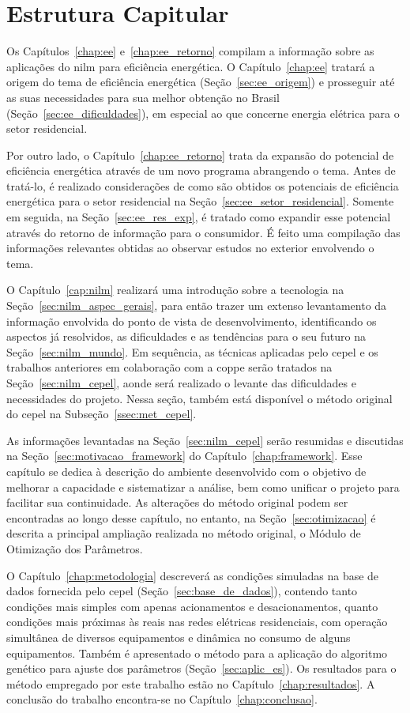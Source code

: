 \section{Estrutura Capitular}

Os Capítulos~\ref{chap:ee} e~\ref{chap:ee_retorno} compilam a
informação sobre as aplicações do \acs{nilm} para eficiência
energética. O Capítulo~\ref{chap:ee} tratará a origem do tema de
eficiência energética (Seção~\ref{sec:ee_origem}) e prosseguir até as
suas necessidades para sua melhor obtenção no Brasil
(Seção~\ref{sec:ee_dificuldades}), em especial ao que concerne
energia elétrica para o setor residencial.

Por outro lado, o Capítulo~\ref{chap:ee_retorno} trata da expansão do
potencial de eficiência energética através de um novo programa
abrangendo o tema. Antes de tratá-lo, é realizado considerações de
como são obtidos os potenciais de eficiência energética para o setor
residencial na Seção~\ref{sec:ee_setor_residencial}. Somente em
seguida, na Seção~\ref{sec:ee_res_exp}, é tratado como expandir esse
potencial através do retorno de informação para o consumidor. É
feito uma compilação das informações relevantes obtidas ao
observar estudos no exterior envolvendo o tema.

O Capítulo~\ref{cap:nilm} realizará uma introdução sobre a tecnologia
na Seção~\ref{sec:nilm_aspec_gerais}, para então trazer um extenso
levantamento da informação envolvida do ponto de vista de
desenvolvimento, identificando os aspectos já resolvidos, as
dificuldades e as tendências para o seu futuro na
Seção~\ref{sec:nilm_mundo}. Em sequência, as técnicas aplicadas pelo
\acs{cepel} e os trabalhos anteriores em colaboração com a \acs{coppe}
serão tratados na Seção~\ref{sec:nilm_cepel}, aonde será realizado o
levante das dificuldades e necessidades do projeto. Nessa seção,
também está disponível o método original do \acs{cepel} na
Subseção~\ref{ssec:met_cepel}.

As informações levantadas na Seção~\ref{sec:nilm_cepel} serão
resumidas e discutidas na Seção~\ref{sec:motivacao_framework} do
Capítulo~\ref{chap:framework}. Esse capítulo se dedica à descrição do
ambiente desenvolvido com o objetivo de melhorar a capacidade e
sistematizar a análise, bem como unificar o projeto para facilitar sua
continuidade. As alterações do método original podem ser
encontradas ao longo desse capítulo, no entanto, na
Seção~\ref{sec:otimizacao} é descrita a principal ampliação realizada
no método original, o Módulo de Otimização dos Parâmetros.

O Capítulo~\ref{chap:metodologia} descreverá as condições simuladas
na base de dados fornecida pelo \acs{cepel}
(Seção~\ref{sec:base_de_dados}), contendo tanto condições mais simples
com apenas acionamentos e desacionamentos, quanto condições mais
próximas às reais nas redes elétricas residenciais, com operação
simultânea de diversos equipamentos e dinâmica no consumo de alguns
equipamentos. Também é apresentado o método para a aplicação do
algoritmo genético para ajuste dos parâmetros
(Seção~\ref{sec:aplic_es}). Os resultados para o método empregado
por este trabalho estão no Capítulo~\ref{chap:resultados}. A conclusão
do trabalho encontra-se no Capítulo~\ref{chap:conclusao}.

\glsunsetall{}
